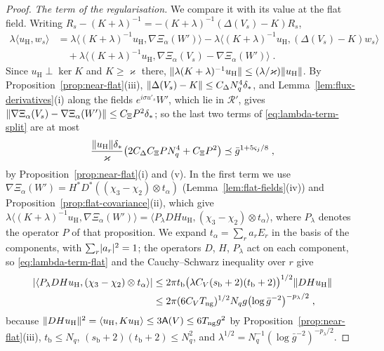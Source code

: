 \documentclass[11pt]{preprint}
\DeclarePairedDelimiter{\abs}{\lvert}{\rvert}
\DeclarePairedDelimiter{\norm}{\lVert}{\rVert}
\numberwithin{equation}{section}
\theoremstyle{definition}
\theoremstyle{remark}
\theoremstyle{plain}
\begin{document}
\begin{proof}
\emph{The term of the regularisation.} We compare it with its value at the flat field. Writing $R_s - (K + \lambda)^{-1} = -(K + \lambda)^{-1}(\Delta(V_s) - K)R_s$,
\begin{equation}\label{eq:lambda-term-split}
    \begin{split}
        \lambda\langle u_{\mathrm H}, w_s\rangle &= \lambda\bigl\langle(K + \lambda)^{-1}u_{\mathrm H}, \nabla\Xi_\alpha(W')\bigr\rangle - \lambda\bigl\langle(K + \lambda)^{-1}u_{\mathrm H}, (\Delta(V_s) - K)w_s\bigr\rangle
        \\
        &\quad + \lambda\bigl\langle(K + \lambda)^{-1}u_{\mathrm H}, \nabla\Xi_\alpha(V_s) - \nabla\Xi_\alpha(W')\bigr\rangle\;.
    \end{split}
\end{equation}
Since $u_{\mathrm H} \perp \ker K$ and $K \geq \varkappa$ there, $\norm{\lambda(K + \lambda)^{-1}u_{\mathrm H}} \leq (\lambda/\varkappa)\norm{u_{\mathrm H}}$. By Proposition~\ref{prop:near-flat}(iii), $\norm{\Delta(V_s) - K} \leq C_\Delta N_q^4\delta_*$, and Lemma~\ref{lem:flux-derivatives}(i) along the fields $e^{i\sigma u'_s}W'$, which lie in $\mathcal R'$, gives $\norm{\nabla\Xi_\alpha(V_s) - \nabla\Xi_\alpha(W')} \leq C_\Xi P^2\delta_*$; so the last two terms of \eqref{eq:lambda-term-split} are at most
\begin{equation}\label{eq:lambda-term-rest}
    \frac{\norm{u_{\mathrm H}}\delta_*}{\varkappa}\bigl(2C_\Delta C_\Xi PN_q^4 + C_\Xi P^2\bigr) \preceq \bar g^{1+5\varsigma_j/8}\;,
\end{equation}
by Proposition~\ref{prop:near-flat}(i) and (v). In the first term we use $\nabla\Xi_\alpha(W') = H^*D^*((\chi_3 - \chi_2) \otimes t_\alpha)$ (Lemma~\ref{lem:flat-fields}(iv)) and Proposition~\ref{prop:flat-covariance}(ii), which give $\lambda\langle(K + \lambda)^{-1}u_{\mathrm H}, \nabla\Xi_\alpha(W')\rangle = \langle P_\lambda DHu_{\mathrm H}, (\chi_3 - \chi_2) \otimes t_\alpha\rangle$, where $P_\lambda$ denotes the operator $P$ of that proposition. We expand $t_\alpha = \sum_ra_rE_r$ in the basis of the components, with $\sum_r\abs{a_r}^2 = 1$; the operators $D$, $H$, $P_\lambda$ act on each component, so \eqref{eq:lambda-term-flat} and the Cauchy--Schwarz inequality over $r$ give
\begin{equation}\label{eq:lambda-term-main}
    \begin{split}
        \abs{\langle P_\lambda DHu_{\mathrm H}, (\chi_3 - \chi_2) \otimes t_\alpha\rangle} &\leq 2\pi t_{\mathrm b}\bigl(\lambda C_V(s_{\mathrm b} + 2)(t_{\mathrm b} + 2)\bigr)^{1/2}\norm{DHu_{\mathrm H}}
        \\
        &\leq 2\pi(6C_VT_{\mathrm{ng}})^{1/2}N_qg\bigl(\log\bar g^{-2}\bigr)^{-p_\lambda/2}\;,
    \end{split}
\end{equation}
because $\norm{DHu_{\mathrm H}}^2 = \langle u_{\mathrm H}, Ku_{\mathrm H}\rangle \leq 3\mathsf A(V) \leq 6T_{\mathrm{ng}}g^2$ by Proposition~\ref{prop:near-flat}(iii), $t_{\mathrm b} \leq N_q$, $(s_{\mathrm b} + 2)(t_{\mathrm b} + 2) \leq N_q^2$, and $\lambda^{1/2} = N_q^{-1}(\log\bar g^{-2})^{-p_\lambda/2}$.


\end{proof}
\end{document}
